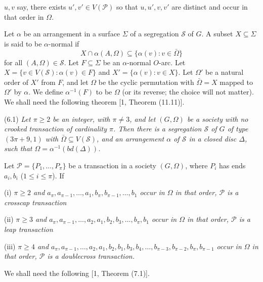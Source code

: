 \noindent $u, v$ say, there exists $u', v' \in V(\mathcal{P})$ so that $u, u', v, v'$ are distinct and occur in that order in $\Omega$.

Let $\alpha$ be an arrangement in a surface $\Sigma$ of a segregation $\mathcal{S}$ of $G$. A subset $X \subseteq \Sigma$ is said to be $\alpha$-normal if
\begin{equation*}
X \cap \alpha(A, \Omega) \subseteq \{\alpha(v) : v \in \bar{\Omega}\}
\end{equation*}
for all $(A, \Omega) \in \mathcal{S}$. Let $F \subseteq \Sigma$ be an $\alpha$-normal $O$-arc. Let $X = \{v \in V(\mathcal{S}) : \alpha(v) \in F\}$ and $X' = \{\alpha(v) : v \in X\}$. Let $\Omega'$ be a natural order of $X'$ from $F$, and let $\Omega$ be the cyclic permutation with $\bar{\Omega} = X$ mapped to $\Omega'$ by $\alpha$. We define $\alpha^{-1}(F)$ to be $\Omega$ (or its reverse; the choice will not matter). We shall need the following theorem [1, Theorem (11.11)].

\stmt
(6.1) \textit{Let $\pi \ge 2$ be an integer, with $\pi \ne 3$, and let $(G, \Omega)$ be a society with no crooked transaction of cardinality $\pi$. Then there is a segregation $\mathcal{S}$ of $G$ of type $(3\pi + 9, 1)$ with $\bar{\Omega} \subseteq V(\mathcal{S})$, and an arrangement $\alpha$ of $\mathcal{S}$ in a closed disc $\Delta$, such that $\Omega = \alpha^{-1}(bd(\Delta))$.}

Let $\mathcal{P} = \{P_1, \ldots, P_\pi\}$ be a transaction in a society $(G, \Omega)$, where $P_i$ has ends $a_i, b_i$ ($1 \le i \le \pi$). If

\hspace*{12pt}(i) \textit{$\pi \ge 2$ and $a_\pi, a_{\pi-1}, \ldots, a_1, b_\pi, b_{\pi-1}, \ldots, b_1$ occur in $\Omega$ in that order, $\mathcal{P}$ is a crosscap transaction}

\hspace*{12pt}(ii) \textit{$\pi \ge 3$ and $a_\pi, a_{\pi-1}, \ldots, a_2, a_1, b_2, b_3, \ldots, b_\pi, b_1$ occur in $\Omega$ in that order, $\mathcal{P}$ is a leap transaction}

\hspace*{12pt}(iii) \textit{$\pi \ge 4$ and $a_\pi, a_{\pi-1}, \ldots, a_2, a_1, b_2, b_1, b_3, b_4, \ldots, b_{\pi-3}, b_{\pi-2}, b_\pi, b_{\pi-1}$ occur in $\Omega$ in that order, $\mathcal{P}$ is a doublecross transaction.}

We shall need the following [1, Theorem (7.1)].

